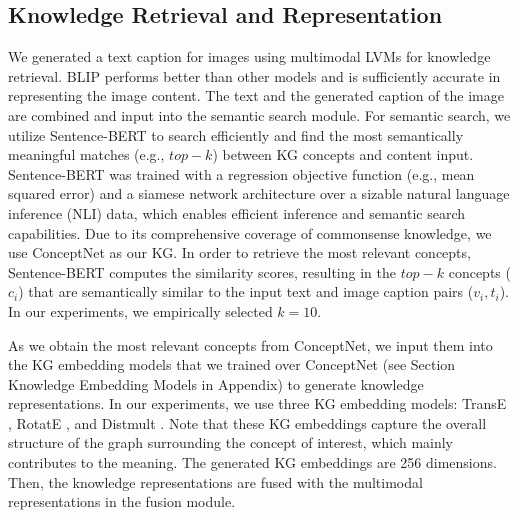 {\subsection{Knowledge Retrieval and Representation}
\label{sec:explicit-knowledge}
\vspace{-1mm}
We generated a text caption for images using multimodal LVMs for knowledge retrieval. BLIP \cite{li2022blip} performs better than other models and is sufficiently accurate in representing the image content. The text and the generated caption of the image are combined and input into the semantic search module. For semantic search, we utilize Sentence-BERT \cite{reimers2019sentence} to search efficiently and find the most semantically meaningful matches (e.g., $top-k$) between  KG concepts and content input. Sentence-BERT was trained with a regression objective function (e.g., mean squared error) and a siamese network architecture over a sizable natural language inference (NLI) data, which enables efficient inference and semantic search capabilities. 
Due to its comprehensive coverage of commonsense knowledge, we use ConceptNet \cite{speer2018conceptnet} as our KG. In order to retrieve the most relevant concepts, Sentence-BERT computes the similarity scores, resulting in the $top-k$ concepts ($c_i$) that are semantically similar to the input text and image caption pairs ($v_i,t_i$). In our experiments, we empirically selected $k= 10$. 


As we obtain the most relevant concepts from ConceptNet, we input them into the KG embedding models that we trained over ConceptNet (see Section Knowledge Embedding Models in Appendix) to generate knowledge representations. In our experiments, we use three KG embedding models: TransE \cite{bordes2013translating}, RotatE \cite{sun2019rotate}, and Distmult \cite{Yang2014-yd}. Note that these KG embeddings capture the overall structure of the graph surrounding the concept of interest, which mainly contributes to the meaning. The generated KG embeddings are 256 dimensions. 
Then, the knowledge representations are fused with the multimodal representations in the fusion module. 


}

